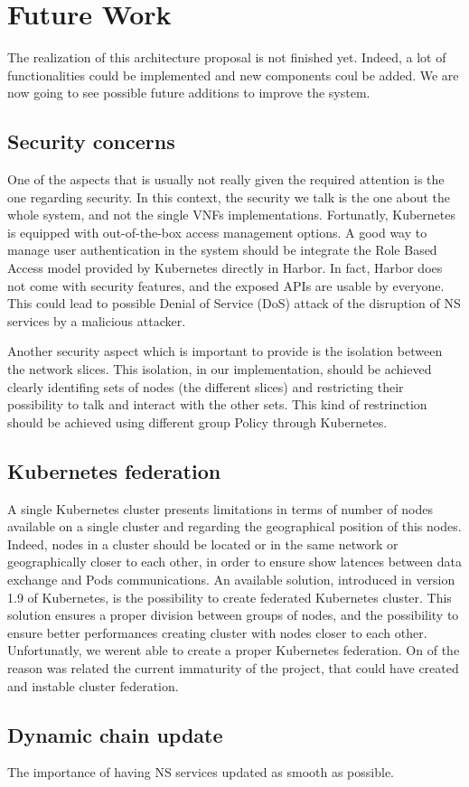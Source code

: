 \chapter{Future Work}
\label{chap:fw}

The realization of this architecture proposal is not finished yet. Indeed, a lot
of functionalities could be implemented and new components coul be added. We are
now going to see possible future additions to improve the system.

\section{Security concerns}

One of the aspects that is usually not really given the required attention is
the one regarding security. In this context, the security we talk is the one
about the whole system, and not the single VNFs implementations. Fortunatly,
Kubernetes is equipped with out-of-the-box access management options. A good way
to manage user authentication in the system should be integrate the Role Based
Access model provided by Kubernetes directly in Harbor. In fact, Harbor does not
come with security features, and the exposed APIs are usable by everyone. This
could lead to possible Denial of Service (DoS) attack of the disruption of NS
services by a malicious attacker.

Another security aspect which is important to provide is the isolation between
the network slices. This isolation, in our implementation, should be achieved
clearly identifing sets of nodes (the different slices) and restricting their
possibility to talk and interact with the other sets. This kind of restrinction
should be achieved using different group Policy through Kubernetes.

\section{Kubernetes federation}

A single Kubernetes cluster presents limitations in terms of number of nodes
available on a single cluster and regarding the geographical position of this
nodes. Indeed, nodes in a cluster should be located or in the same network or
geographically closer to each other, in order to ensure show latences between
data exchange and Pods communications. An available solution, introduced in
version 1.9 of Kubernetes, is the possibility to create federated Kubernetes
cluster. This solution ensures a proper division between groups of nodes, and
the possibility to ensure better performances creating cluster with nodes closer
to each other. Unfortunatly, we werent able to create a proper Kubernetes
federation. On of the reason was related the current immaturity of the project,
that could have created and instable cluster federation.

\section{Dynamic chain update}

The importance of having NS services updated as smooth as possible.
